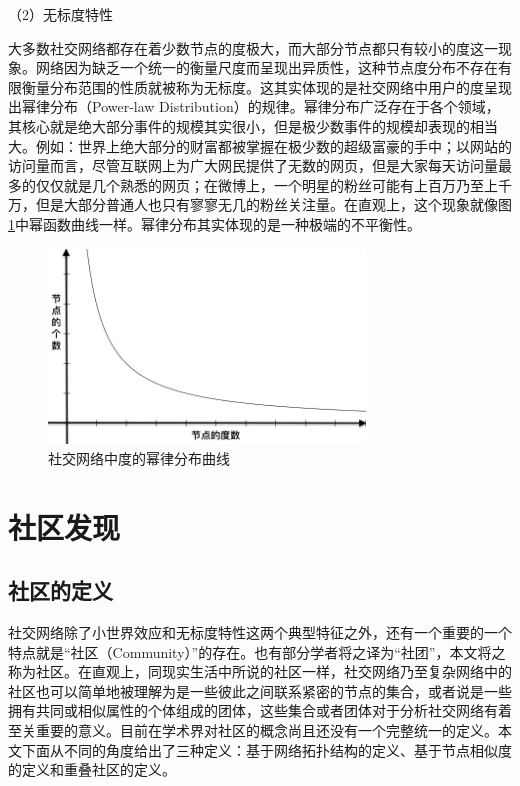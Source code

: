 （2）无标度特性

大多数社交网络都存在着少数节点的度极大，而大部分节点都只有较小的度这一现象。网络因为缺乏一个统一的衡量尺度而呈现出异质性，这种节点度分布不存在有限衡量分布范围的性质就被称为无标度。这其实体现的是社交网络中用户的度呈现出幂律分布（Power-law Distribution）的规律。幂律分布广泛存在于各个领域，其核心就是绝大部分事件的规模其实很小，但是极少数事件的规模却表现的相当大。例如：世界上绝大部分的财富都被掌握在极少数的超级富豪的手中；以网站的访问量而言，尽管互联网上为广大网民提供了无数的网页，但是大家每天访问量最多的仅仅就是几个熟悉的网页；在微博上，一个明星的粉丝可能有上百万乃至上千万，但是大部分普通人也只有寥寥无几的粉丝关注量。在直观上，这个现象就像图\ref{fig:fig2-2}中幂函数曲线一样。幂律分布其实体现的是一种极端的不平衡性。

\begin{figure}
  \centering
  \includegraphics[width=0.75\textwidth]{figures/fig2-2}
  \caption{社交网络中度的幂律分布曲线}\label{fig:fig2-2}
\end{figure}

\section{社区发现}
\subsection{社区的定义}
社交网络除了小世界效应和无标度特性这两个典型特征之外，还有一个重要的一个特点就是“社区（Community）”的存在。也有部分学者将之译为“社团”，本文将之称为社区。在直观上，同现实生活中所说的社区一样，社交网络乃至复杂网络中的社区也可以简单地被理解为是一些彼此之间联系紧密的节点的集合，或者说是一些拥有共同或相似属性的个体组成的团体，这些集合或者团体对于分析社交网络有着至关重要的意义。目前在学术界对社区的概念尚且还没有一个完整统一的定义。本文下面从不同的角度给出了三种定义：基于网络拓扑结构的定义、基于节点相似度的定义和重叠社区的定义。


